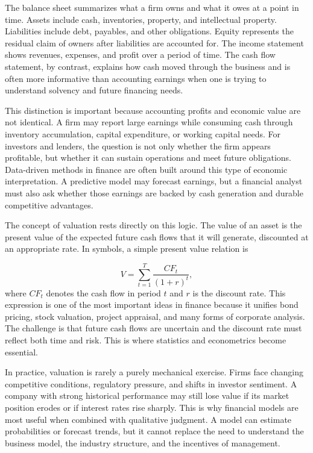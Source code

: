 \documentclass[../ai_in_finance]{subfiles}
\begin{document}
The balance sheet summarizes what a firm owns and what it owes at a point in time. Assets include cash, inventories, property, and intellectual property. Liabilities include debt, payables, and other obligations. Equity represents the residual claim of owners after liabilities are accounted for. The income statement shows revenues, expenses, and profit over a period of time. The cash flow statement, by contrast, explains how cash moved through the business and is often more informative than accounting earnings when one is trying to understand solvency and future financing needs.

This distinction is important because accounting profits and economic value are not identical. A firm may report large earnings while consuming cash through inventory accumulation, capital expenditure, or working capital needs. For investors and lenders, the question is not only whether the firm appears profitable, but whether it can sustain operations and meet future obligations. Data-driven methods in finance are often built around this type of economic interpretation. A predictive model may forecast earnings, but a financial analyst must also ask whether those earnings are backed by cash generation and durable competitive advantages.

The concept of valuation rests directly on this logic. The value of an asset is the present value of the expected future cash flows that it will generate, discounted at an appropriate rate. In symbols, a simple present value relation is

\begin{equation*}
V = \sum_{t=1}^{T} \frac{CF_t}{(1+r)^t},
\end{equation*}
where $CF_t$ denotes the cash flow in period $t$ and $r$ is the discount rate. This expression is one of the most important ideas in finance because it unifies bond pricing, stock valuation, project appraisal, and many forms of corporate analysis. The challenge is that future cash flows are uncertain and the discount rate must reflect both time and risk. This is where statistics and econometrics become essential.

In practice, valuation is rarely a purely mechanical exercise. Firms face changing competitive conditions, regulatory pressure, and shifts in investor sentiment. A company with strong historical performance may still lose value if its market position erodes or if interest rates rise sharply. This is why financial models are most useful when combined with qualitative judgment. A model can estimate probabilities or forecast trends, but it cannot replace the need to understand the business model, the industry structure, and the incentives of management.
\end{document}
